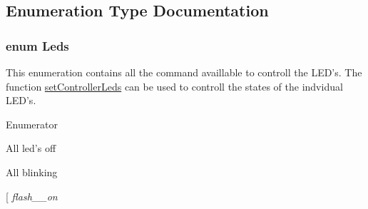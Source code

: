 \subsection{Enumeration Type Documentation}
\hypertarget{group__xbcdeamon_ga1e4b1d1d1b6272a280f18efef4db3f5e}{
\subsubsection[{Leds}]{\setlength{\rightskip}{0pt plus 5cm}enum {\bf Leds}}}\label{group__xbcdeamon_ga1e4b1d1d1b6272a280f18efef4db3f5e}
This enumeration contains all the command availlable to controll the L\-E\-D's. The function \hyperlink{group__xbcdeamon_gacc1e0a36aea4db307a6700c13a74b4fb}{set\-Controller\-Leds} can be used to controll the states of the indvidual L\-E\-D's. \begin{Desc}
\item[Enumerator]\par
\begin{description}
\item[{\em 
\hypertarget{group__xbcdeamon_gga1e4b1d1d1b6272a280f18efef4db3f5ea2040b2792c2d14984b958e00e6189b4b}{blink\-\_\-all}\label{group__xbcdeamon_gga1e4b1d1d1b6272a280f18efef4db3f5ea2040b2792c2d14984b958e00e6189b4b}
}]All led's off \item[{\em 
\hypertarget{group__xbcdeamon_gga1e4b1d1d1b6272a280f18efef4db3f5eaa69975e19b7da2c0d7251d995891a668}{flash\-\_\-1\-\_\-on}\label{group__xbcdeamon_gga1e4b1d1d1b6272a280f18efef4db3f5eaa69975e19b7da2c0d7251d995891a668}
}]All blinking \item[{\em 
\hypertarget{group__xbcdeamon_gga1e4b1d1d1b6272a280f18efef4db3f5ea502a3fc79bff4af26fb485afb789af32}{flash\-\_\-\_\-on}\label{group__xbcdeamon_gga1e4b1d1d1b6272a280f18efef4db3f5ea502a3fc79bff4af26fb485afb789af32}
}
\end{description}
\end{Desc}
